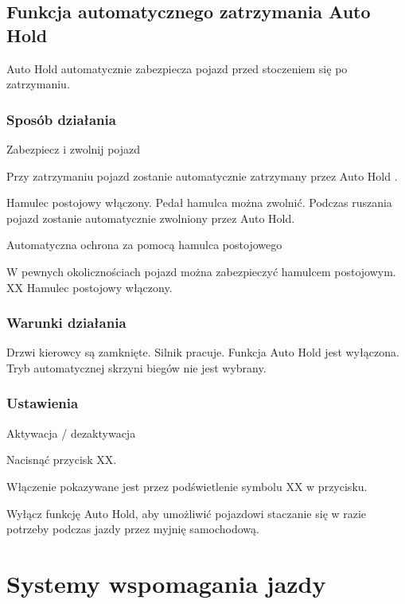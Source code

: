 \subsection{Funkcja automatycznego zatrzymania Auto Hold}

Auto Hold automatycznie zabezpiecza pojazd przed stoczeniem się po zatrzymaniu.

\subsubsection{Sposób działania}

Zabezpiecz i zwolnij pojazd

Przy zatrzymaniu pojazd zostanie automatycznie zatrzymany przez Auto Hold .

Hamulec postojowy włączony. Pedał hamulca można zwolnić.
Podczas ruszania pojazd zostanie automatycznie zwolniony przez Auto Hold.

Automatyczna ochrona za pomocą hamulca postojowego

W pewnych okolicznościach pojazd można zabezpieczyć hamulcem postojowym.
XX Hamulec postojowy włączony.

\subsubsection{Warunki działania}

\begin{itemizeTick}
	\itemTick Drzwi kierowcy są zamknięte.
	\itemTick Silnik pracuje.
	\itemTick Funkcja Auto Hold jest wyłączona.
	\itemTick Tryb automatycznej skrzyni biegów \gearN nie jest wybrany.
\end{itemizeTick}

\subsubsection{Ustawienia}

Aktywacja / dezaktywacja
\begin{itemizeArrow}
	\itemArrow Nacisnąć przycisk XX.
\end{itemizeArrow}

Włączenie pokazywane jest przez podświetlenie symbolu XX w przycisku.

Wyłącz funkcję Auto Hold, aby umożliwić pojazdowi staczanie się w razie potrzeby podczas jazdy przez myjnię samochodową.

\section{Systemy wspomagania jazdy}

